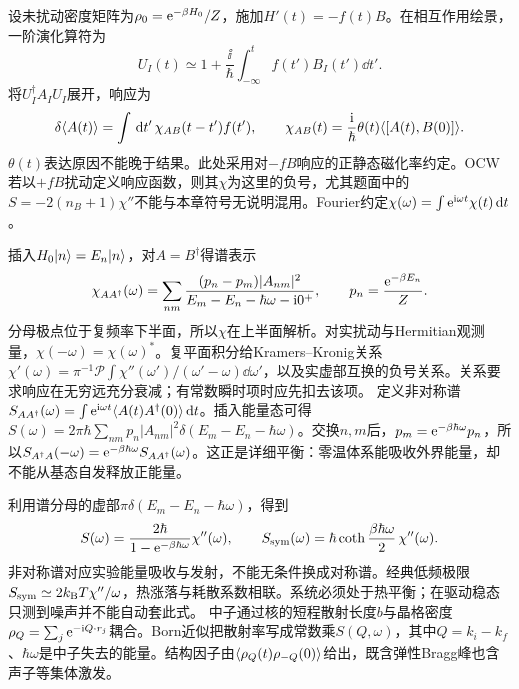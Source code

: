 \label{ch:response}
设未扰动密度矩阵为$\rho_0=\mathrm e^{-\beta H_0}/Z$，施加$H'(t)=-f(t)B$。在相互作用绘景，一阶演化算符为
\begin{equation}
U_I(t)\simeq1+\frac\ii\hbar\int_{-\infty}^t f(t')B_I(t')\dd t'.
\end{equation}
将$U_I^\dagger A_IU_I$展开，响应为
\begin{equation}
\delta\langle A(t)\rangle=\int\,\mathrm d t'\,\chi_{AB}(t-t')f(t'),\qquad\chi_{AB}(t)=\frac{\mathrm i}\hbar\theta(t)\langle [A(t),B(0)]\rangle.
\end{equation}
$\theta(t)$表达原因不能晚于结果。此处采用对$-fB$响应的正静态磁化率约定。OCW若以$+fB$扰动定义响应函数，则其$\chi$为这里的负号，尤其题面中的$S=-2(n_B+1)\chi''$不能与本章符号无说明混用。Fourier约定$\chi(\omega)=\int\mathrm e^{\mathrm i\omega t}\chi(t)\,\mathrm d t$。

插入$H_0\lvert n\rangle=E_n\lvert n\rangle$，对$A=B^\dagger$得谱表示
\begin{equation}
\chi_{AA^\dagger}(\omega)=\sum_{nm}\frac{(p_n-p_m)|A_{nm}|^2}{E_m-E_n-\hbar\omega-\mathrm i0^+},\qquad p_n=\frac{\mathrm e^{-\beta E_n}}Z.
\end{equation}
分母极点位于复频率下半面，所以$\chi$在上半面解析。对实扰动与Hermitian观测量，$\chi(-\omega)=\chi(\omega)^*$。复平面积分给Kramers--Kronig关系$\chi'(\omega)=\pi^{-1}\mathcal P\int\chi''(\omega')/(\omega'-\omega)\dd\omega'$，以及实虚部互换的负号关系。关系要求响应在无穷远充分衰减；有常数瞬时项时应先扣去该项。
定义非对称谱$S_{AA^\dagger}(\omega)=\int\mathrm e^{\mathrm i\omega t}\langle A(t)A^\dagger(0)\rangle\,\mathrm d t$。插入能量态可得$S(\omega)=2\pi\hbar\sum_{nm}p_n|A_{nm}|^2\delta(E_m-E_n-\hbar\omega)$。交换$n,m$后，$p_m=\mathrm e^{-\beta\hbar\omega}p_n$，所以$S_{A^\dagger A}(-\omega)=\mathrm e^{-\beta\hbar\omega}S_{AA^\dagger}(\omega)$。这正是详细平衡：零温体系能吸收外界能量，却不能从基态自发释放正能量。

利用谱分母的虚部$\pi\delta(E_m-E_n-\hbar\omega)$，得到
\begin{equation}
S(\omega)=\frac{2\hbar}{1-\mathrm e^{-\beta\hbar\omega}}\chi''(\omega),\qquad S_{\rm sym}(\omega)=\hbar\coth\frac{\beta\hbar\omega}2\,\chi''(\omega).
\end{equation}
非对称谱对应实验能量吸收与发射，不能无条件换成对称谱。经典低频极限$S_{\rm sym}\simeq2k_{\mathrm B} T\chi''/\omega$，热涨落与耗散系数相联。系统必须处于热平衡；在驱动稳态只测到噪声并不能自动套此式。
中子通过核的短程散射长度$b$与晶格密度$\rho_Q=\sum_j\mathrm e^{-\mathrm i Q\cdot r_j}$耦合。Born近似把散射率写成常数乘$S(Q,\omega)$，其中$Q=k_i-k_f$、$\hbar\omega$是中子失去的能量。结构因子由$\langle \rho_Q(t)\rho_{-Q}(0)\rangle$给出，既含弹性Bragg峰也含声子等集体激发。

